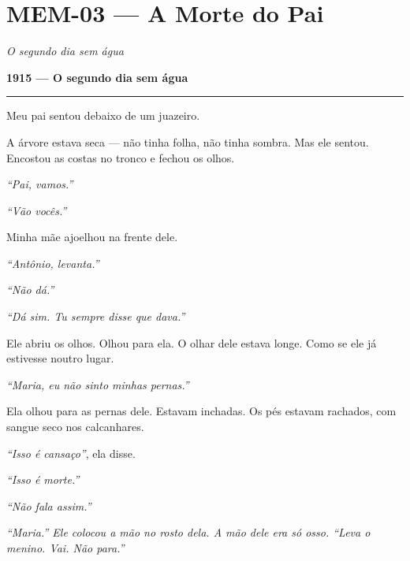 \section*{\textbf{MEM-03} --- A Morte do Pai}

\noindent \textit{O segundo dia sem água}

\noindent \textbf{1915 --- O segundo dia sem água}

\vspace{0.5em}\noindent\rule{\textwidth}{0.5pt}\vspace{0.5em}

\noindent Meu pai sentou debaixo de um juazeiro.

\noindent A árvore estava seca --- não tinha folha, não tinha sombra. Mas ele sentou. Encostou as costas no tronco e fechou os olhos.

\noindent \textit{\textquotedblleft{}Pai, vamos.\textquotedblright{}}

\noindent \textit{\textquotedblleft{}Vão vocês.\textquotedblright{}}

\noindent Minha mãe ajoelhou na frente dele.

\noindent \textit{\textquotedblleft{}Antônio, levanta.\textquotedblright{}}

\noindent \textit{\textquotedblleft{}Não dá.\textquotedblright{}}

\noindent \textit{\textquotedblleft{}Dá sim. Tu sempre disse que dava.\textquotedblright{}}

\noindent Ele abriu os olhos. Olhou para ela. O olhar dele estava longe. Como se ele já estivesse noutro lugar.

\noindent \textit{\textquotedblleft{}Maria, eu não sinto minhas pernas.\textquotedblright{}}

\noindent Ela olhou para as pernas dele. Estavam inchadas. Os pés estavam rachados, com sangue seco nos calcanhares.

\noindent \textit{\textquotedblleft{}Isso é cansaço\textquotedblright{}}, ela disse.

\noindent \textit{\textquotedblleft{}Isso é morte.\textquotedblright{}}

\noindent \textit{\textquotedblleft{}Não fala assim.\textquotedblright{}}

\noindent \textit{\textquotedblleft{}Maria.\textquotedblright{}\textit{ Ele colocou a mão no rosto dela. A mão dele era só osso. }\textquotedblleft{}Leva o menino. Vai. Não para.\textquotedblright{}}


